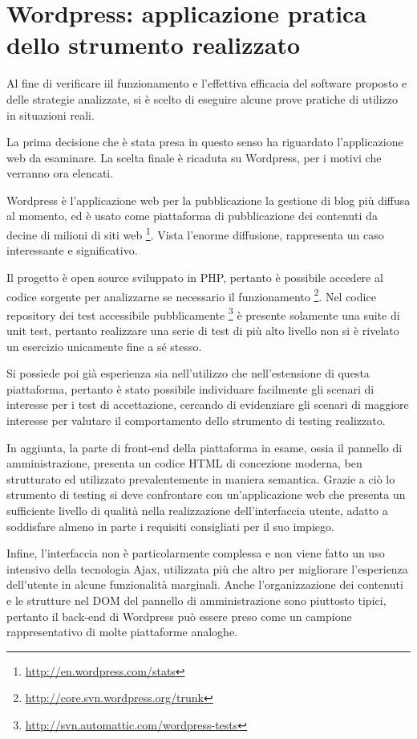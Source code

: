 \chapter{Wordpress: applicazione pratica dello strumento realizzato}

Al fine di verificare iil funzionamento e l'effettiva efficacia del software proposto e delle strategie analizzate, si è scelto di eseguire alcune prove pratiche di utilizzo in situazioni reali. 

La prima decisione che è stata presa in questo senso ha riguardato l'applicazione web da esaminare. La scelta finale è ricaduta su Wordpress, per i motivi che verranno ora elencati.

Wordpress è l'applicazione web per la pubblicazione la gestione di blog più diffusa al momento, ed è usato come piattaforma di pubblicazione dei contenuti da decine di milioni di siti web \footnote{\url{http://en.wordpress.com/stats}}. Vista l'enorme diffusione, rappresenta un caso interessante e significativo.

Il progetto è open source sviluppato in PHP, pertanto è possibile accedere al codice sorgente per analizzarne se necessario il funzionamento \footnote{\url{http://core.svn.wordpress.org/trunk}}. Nel codice repository dei test accessibile pubblicamente \footnote{\url{http://svn.automattic.com/wordpress-tests}} è presente solamente una suite di unit test, pertanto realizzare una serie di test di più alto livello non si è rivelato un esercizio unicamente fine a sé stesso.

Si possiede poi già esperienza sia nell'utilizzo che nell'estensione di questa piattaforma, pertanto è stato possibile individuare facilmente gli scenari di interesse per i test di accettazione, cercando di evidenziare gli scenari di maggiore interesse per valutare il comportamento dello strumento di testing realizzato. 

In aggiunta, la parte di front-end della piattaforma in esame, ossia il pannello di amministrazione, presenta un codice HTML di concezione moderna, ben strutturato ed utilizzato prevalentemente in maniera semantica. Grazie a ciò lo strumento di testing si deve confrontare con un'applicazione web che presenta un sufficiente livello di qualità nella realizzazione dell'interfaccia utente, adatto a soddisfare almeno in parte i requisiti consigliati per il suo impiego.

Infine, l'interfaccia non è particolarmente complessa e non viene fatto un uso intensivo della tecnologia Ajax, utilizzata più che altro per migliorare l'esperienza dell'utente in alcune funzionalità marginali. Anche l'organizzazione dei contenuti e le strutture nel DOM del pannello di amministrazione sono piuttosto tipici, pertanto il back-end di Wordpress può essere preso come un campione rappresentativo di molte piattaforme analoghe.

